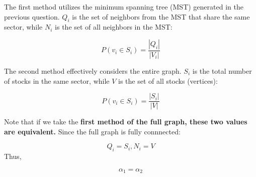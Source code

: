 \documentclass[11pt]{article}
\begin{document}
The first method utilizes the minimum spanning tree (MST) generated in the previous question. \(Q_i\) is the set of neighbors from the MST that share the same sector, while \(N_i\) is the set of all neighbors in the MST:

$$P(v_i\in S_i) = \frac{|Q_i|}{|V_i|}$$


The second method effectively considers the entire graph. \(S_i\) is the total number of stocks in the same sector, while \(V\) is the set of all stocks (vertices):

$$P(v_i\in S_i) = \frac{|S_i|}{|V|}$$


Note that if we take the \textbf{first method of the full graph, these two values are equivalent.}
 Since the full graph is fully connnected:

$$Q_i = S_i,  N_i = V$$
Thus,

$$\alpha_1 = \alpha_2$$
\end{document}
